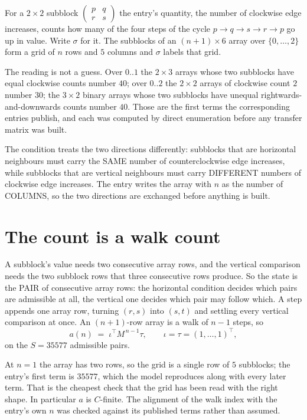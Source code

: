 \documentclass[11pt,a4paper]{article}
\theoremstyle{plain}
\theoremstyle{definition}
\begin{document}
For a $2\times2$ subblock $\begin{pmatrix}p&q\\r&s\end{pmatrix}$ the
entry's quantity, the number of clockwise edge increases, counts how many of the four steps of the cycle $p\to q\to s\to r\to p$ go up in value. Write $\sigma$ for it. The subblocks of an
$(n+1)\times6$ array over $\{0,\dots,2\}$ form a grid of $n$ rows and $5$
columns and $\sigma$ labels that grid.

The reading is not a guess. Over $0..1$ the $2\times3$ arrays whose two subblocks have equal
clockwise counts number $40$; over $0..2$ the $2\times2$ arrays of clockwise count $2$ number
$30$; the $3\times2$ binary arrays whose two subblocks have unequal rightwards-and-downwards
counts number $40$. Those are the first terms the corresponding entries publish, and each was
computed by direct enumeration before any transfer matrix was built.

The condition treats the two directions differently: subblocks that are horizontal neighbours
must carry the SAME number of counterclockwise edge increases, while subblocks that are vertical neighbours must carry
DIFFERENT numbers of clockwise edge increases. The entry writes the array with $n$ as the number of COLUMNS, so the two directions are exchanged before anything is built.

\section{The count is a walk count}

A subblock's value needs two consecutive array rows, and the vertical
comparison needs the two subblock rows that three consecutive rows produce. So the state is the
PAIR of consecutive array rows: the horizontal condition decides which pairs are admissible at
all, the vertical one decides which pair may follow which. A step appends one array row,
turning $(r,s)$ into $(s,t)$ and settling every vertical comparison at once. An $(n+1)$-row
array is a walk of $n-1$ steps, so
\[
a(n)\;=\;\iota^{\!\top}M^{\,n-1}\tau,\qquad\iota=\tau=(1,\dots,1)^{\!\top},
\]
on the $S=35577$ admissible pairs.

At $n=1$ the array has two rows, so the grid is a single row of $5$
subblocks; the entry's first term is $35577$, which the model
reproduces along with every later term. That is the cheapest check that the grid has been read
with the right shape.
In particular $a$ is $C$-finite. The alignment of the walk index with the entry's own $n$ was
checked against its published terms rather than assumed.
\end{document}
